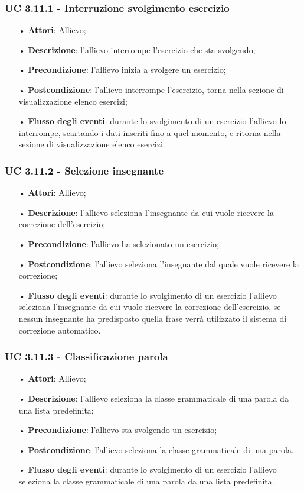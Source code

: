 \subsubsection{UC 3.11.1 - Interruzione svolgimento esercizio}
\begin{itemize}
	\item[•]\textbf{Attori}: Allievo;
	\item[•]\textbf{Descrizione}: l'allievo interrompe l'esercizio che sta svolgendo;
	\item[•]\textbf{Precondizione}: l'allievo inizia a svolgere un esercizio;
	\item[•]\textbf{Postcondizione}: l'allievo interrompe l'esercizio, torna nella sezione di visualizzazione elenco esercizi;
	\item[•]\textbf{Flusso degli eventi}: durante lo svolgimento di un esercizio l'allievo lo interrompe, scartando i dati inseriti fino a quel momento, e ritorna nella sezione di visualizzazione elenco esercizi.
\end{itemize}

\subsubsection{UC 3.11.2 - Selezione insegnante}
\begin{itemize}
	\item[•]\textbf{Attori}: Allievo;
	\item[•]\textbf{Descrizione}: l'allievo seleziona l'insegnante da cui vuole ricevere la correzione dell'esercizio;
	\item[•]\textbf{Precondizione}: l'allievo ha selezionato un esercizio;
	\item[•]\textbf{Postcondizione}: l'allievo seleziona l'insegnante dal quale vuole ricevere la correzione;
	\item[•]\textbf{Flusso degli eventi}: durante lo svolgimento di un esercizio  l'allievo seleziona l'insegnante da cui vuole ricevere la correzione dell'esercizio, se nessun insegnante ha predisposto quella frase verrà utilizzato il sistema di correzione automatico.
\end{itemize}

\subsubsection{UC 3.11.3 - Classificazione parola}
\begin{itemize}
	\item[•]\textbf{Attori}: Allievo;
	\item[•]\textbf{Descrizione}: l'allievo seleziona la classe grammaticale di una parola da una lista predefinita;
	\item[•]\textbf{Precondizione}: l'allievo sta svolgendo un esercizio;
	\item[•]\textbf{Postcondizione}: l'allievo seleziona la classe grammaticale di una parola.
	\item[•]\textbf{Flusso degli eventi}: durante lo svolgimento di un esercizio  l'allievo seleziona la classe grammaticale di una parola da una lista predefinita.
\end{itemize}


